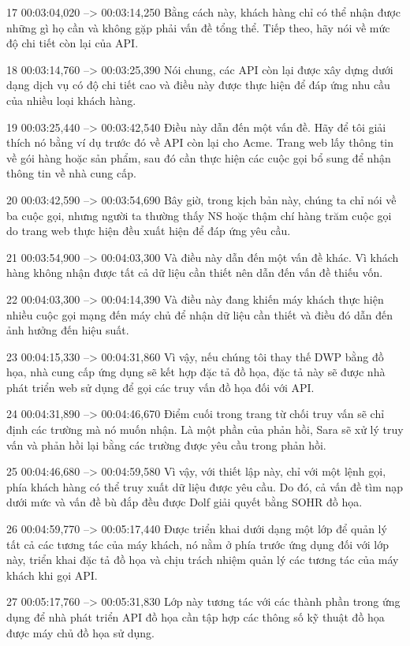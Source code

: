 17
00:03:04,020 --> 00:03:14,250
Bằng cách này, khách hàng chỉ có thể nhận được những gì họ cần và không gặp phải vấn đề tổng thể.  Tiếp theo, hãy nói về mức độ chi tiết còn lại của API.

18
00:03:14,760 --> 00:03:25,390
Nói chung, các API còn lại được xây dựng dưới dạng dịch vụ có độ chi tiết cao và điều này được thực hiện để đáp ứng nhu cầu của nhiều loại khách hàng.

19
00:03:25,440 --> 00:03:42,540
Điều này dẫn đến một vấn đề.  Hãy để tôi giải thích nó bằng ví dụ trước đó về API còn lại cho Acme.  Trang web lấy thông tin về gói hàng hoặc sản phẩm, sau đó cần thực hiện các cuộc gọi bổ sung để nhận thông tin về nhà cung cấp.

20
00:03:42,590 --> 00:03:54,690
Bây giờ, trong kịch bản này, chúng ta chỉ nói về ba cuộc gọi, nhưng người ta thường thấy NS hoặc thậm chí hàng trăm cuộc gọi do trang web thực hiện đều xuất hiện để đáp ứng yêu cầu.

21
00:03:54,900 --> 00:04:03,300
Và điều này dẫn đến một vấn đề khác.  Vì khách hàng không nhận được tất cả dữ liệu cần thiết nên dẫn đến vấn đề thiếu vốn.

22
00:04:03,300 --> 00:04:14,390
Và điều này đang khiến máy khách thực hiện nhiều cuộc gọi mạng đến máy chủ để nhận dữ liệu cần thiết và điều đó dẫn đến ảnh hưởng đến hiệu suất.

23
00:04:15,330 --> 00:04:31,860
Vì vậy, nếu chúng tôi thay thế DWP bằng đồ họa, nhà cung cấp ứng dụng sẽ kết hợp đặc tả đồ họa, đặc tả này sẽ được nhà phát triển web sử dụng để gọi các truy vấn đồ họa đối với API.

24
00:04:31,890 --> 00:04:46,670
Điểm cuối trong trang từ chối truy vấn sẽ chỉ định các trường mà nó muốn nhận.  Là một phần của phản hồi, Sara sẽ xử lý truy vấn và phản hồi lại bằng các trường được yêu cầu trong phản hồi.

25
00:04:46,680 --> 00:04:59,580
Vì vậy, với thiết lập này, chỉ với một lệnh gọi, phía khách hàng có thể truy xuất dữ liệu được yêu cầu.  Do đó, cả vấn đề tìm nạp dưới mức và vấn đề bù đắp đều được Dolf giải quyết bằng SOHR đồ họa.

26
00:04:59,770 --> 00:05:17,440
Được triển khai dưới dạng một lớp để quản lý tất cả các tương tác của máy khách, nó nằm ở phía trước ứng dụng đối với lớp này, triển khai đặc tả đồ họa và chịu trách nhiệm quản lý các tương tác của máy khách khi gọi API.

27
00:05:17,760 --> 00:05:31,830
Lớp này tương tác với các thành phần trong ứng dụng để nhà phát triển API đồ họa cần tập hợp các thông số kỹ thuật đồ họa được máy chủ đồ họa sử dụng.

